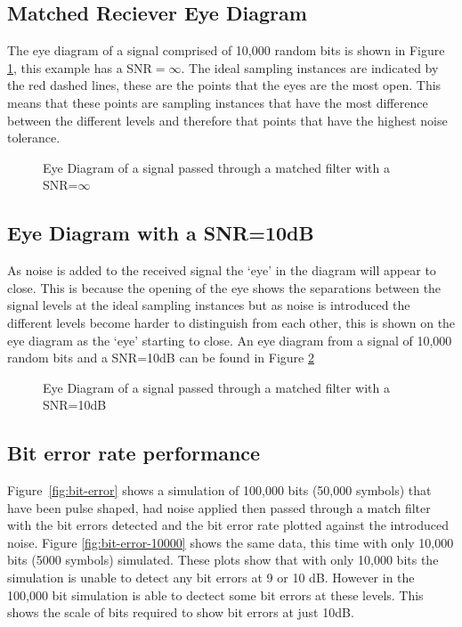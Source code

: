 \subsection{Matched Reciever Eye Diagram}

The eye diagram of a signal comprised of 10,000 random bits is shown in Figure \ref{fig:eye-no-noise}, this example has a SNR$=\infty$.
The ideal sampling instances are indicated by the red dashed lines, these are the points that the eyes are the most open. This means that
these points are sampling instances that have the most difference between the different levels and therefore that points that have the highest
noise tolerance.

\begin{figure}[H]
    \begin{center}
        
    \end{center}
    \caption{Eye Diagram of a signal passed through a matched filter with a SNR=$\infty$}
    \label{fig:eye-no-noise}
\end{figure}

\subsection{Eye Diagram with a SNR=10dB}
As noise is added to the received signal the `eye' in the diagram will appear to close. 
This is because the opening of the eye shows the separations between the signal levels
at the ideal sampling instances but as noise is introduced the different levels become
harder to distinguish from each other, this is shown on the eye diagram as the `eye' 
starting to close. An eye diagram from a signal of 10,000 random bits and a SNR=10dB
can be found in Figure \ref{fig:eye-noise}

\begin{figure}[H]
    \begin{center}
        
    \end{center}
    \caption{Eye Diagram of a signal passed through a matched filter with a SNR=10dB}
    \label{fig:eye-noise}
\end{figure}

\subsection{Bit error rate performance}
Figure~\ref{fig:bit-error} shows a simulation of 100,000 bits (50,000 symbols) that have
been pulse shaped, had noise applied then passed through a match filter with the bit errors
detected and the bit error rate plotted against the introduced noise. Figure \ref{fig:bit-error-10000}
shows the same data, this time with only 10,000 bits (5000 symbols) simulated. These plots
show that with only 10,000 bits the simulation is unable to detect any bit errors at 9 or
10 dB. However in the 100,000 bit simulation is able to dectect some bit errors at these levels.
This shows the scale of bits required to show bit errors at just 10dB.

